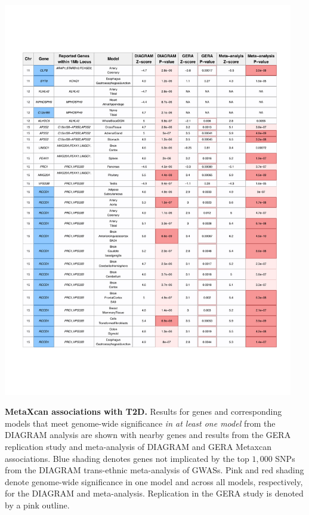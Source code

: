\documentclass[10pt]{article}
\begin{document}
\begin{table}
\ContinuedFloat
\includegraphics[width=0.95\textwidth]{table1_part3.pdf}
\caption{\textbf{MetaXcan associations with T2D.} Results for genes and corresponding models that meet genome-wide significance \textit{in at least one model} from the DIAGRAM analysis are shown with nearby genes and results from the GERA replication study and meta-analysis of DIAGRAM and GERA Metaxcan associations. Blue shading denotes genes not implicated by the top $1,000$ SNPs from the DIAGRAM trans-ethnic meta-analysis of GWASs. Pink and red shading denote genome-wide significance in one model and across all models, respectively, for the DIAGRAM and meta-analysis. Replication in the GERA study is denoted by a pink outline.} \label{tab:table1.part3}
\end{table}
\end{document}
